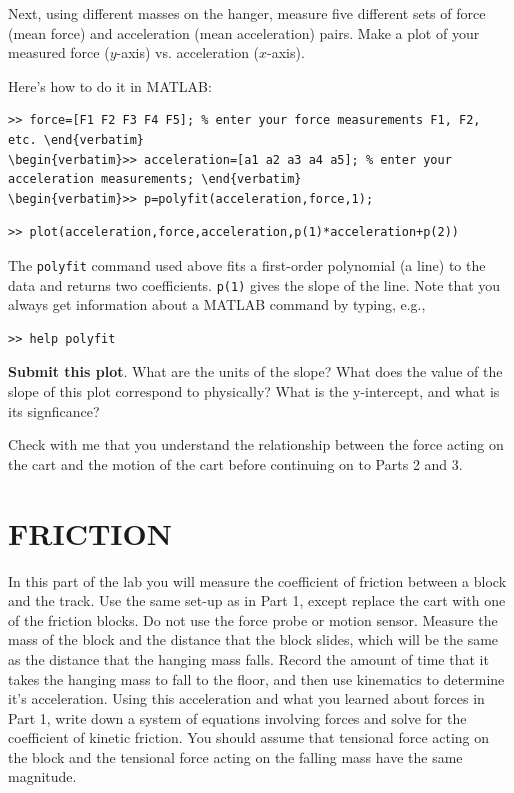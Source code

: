 \documentclass[11pt,letterpaper]{article}
\begin{document}
Next, using different masses on the hanger, measure five different sets of force (mean force) and acceleration (mean acceleration) pairs. Make a plot of your measured force ($y$-axis) vs. acceleration ($x$-axis). 

Here's how to do it in MATLAB:
\begin{verbatim}>> force=[F1 F2 F3 F4 F5]; % enter your force measurements F1, F2, etc. \end{verbatim}
\begin{verbatim}>> acceleration=[a1 a2 a3 a4 a5]; % enter your acceleration measurements; \end{verbatim}
\begin{verbatim}>> p=polyfit(acceleration,force,1); \end{verbatim}
\begin{verbatim}>> plot(acceleration,force,acceleration,p(1)*acceleration+p(2)) \end{verbatim}

The \verb+polyfit+ command used above fits a first-order polynomial (a line) to the data and returns two coefficients. \verb+p(1)+ gives the slope of the line. Note that you always get information about a MATLAB command by typing, e.g., 
\begin{verbatim}>> help polyfit\end{verbatim}

 \textbf{Submit this plot}.  What are the units of the slope?  What does the value of the slope of this plot correspond to physically? What is the y-intercept, and what is its signficance?

Check with me that you understand the relationship between the force acting on the cart and the motion of the cart before continuing on to Parts 2 and 3.

\section{FRICTION}
In this part of the lab you will measure the coefficient of friction between a block and the track. Use the same set-up as in Part 1, except replace the cart with one of the friction blocks. Do not use the force probe or motion sensor. Measure the mass of the block and the distance that the block slides, which will be the same as the distance that the hanging mass falls. Record the amount of time that it takes the hanging mass to fall to the floor, and then use kinematics to determine it's acceleration. Using this acceleration and what you learned about forces in Part 1, write down a system of equations involving forces and solve for the coefficient of kinetic friction. You should assume that tensional force acting on the block and the tensional force acting on the falling mass have the same magnitude.
\end{document}
